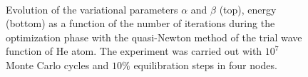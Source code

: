 \begin{figure}[!hbt]
\begin{center}
		\\
		\caption{Evolution of the variational parameters $\alpha$ and $\beta$ (top), energy (bottom) as a function of the number of iterations during the optimization phase with the quasi-Newton method of the trial wave function of He atom. The experiment was carried out with $10^7$ Monte Carlo cycles and $10 \%$ equilibration steps in four nodes.}
		\label{quasiNewtonOptHe}
	\end{center}
\end{figure}

